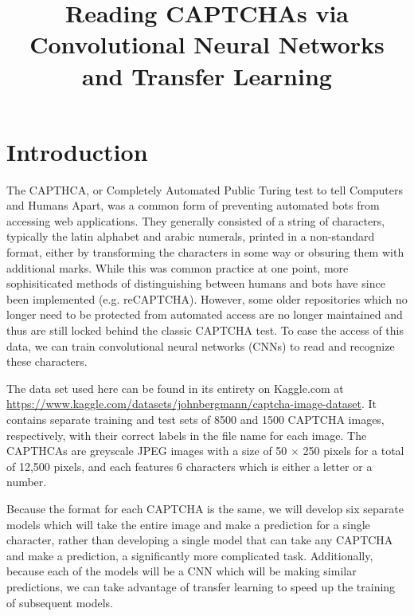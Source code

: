 \documentclass[12pt]{article}
\title{Reading CAPTCHAs via Convolutional Neural Networks and Transfer Learning}
\date{}
\begin{document}
\maketitle

\section*{Introduction}


The CAPTHCA, or Completely Automated Public Turing test to tell Computers
and Humans Apart, was a common form of preventing automated bots from accessing
web applications. They generally consisted of a string of characters, typically
the latin alphabet and arabic numerals, printed in a non-standard format, either
by transforming the characters in some way or obsuring them with additional
marks. While this was common practice at one point, more sophisiticated methods
of distinguishing between humans and bots have since been implemented (e.g.
reCAPTCHA). However, some older repositories which no longer need to be
protected from automated access are no longer maintained and thus are still
locked behind the classic CAPTCHA test. To ease the access of this data, we can
train convolutional neural networks (CNNs) to read and recognize these
characters.


The data set used here can be found in its entirety on Kaggle.com at
\url{https://www.kaggle.com/datasets/johnbergmann/captcha-image-dataset}. It
contains separate training and test sets of 8500 and 1500 CAPTCHA images,
respectively, with their correct labels in the file name for each image. The 
CAPTHCAs are greyscale JPEG images with a size of 50 $\times$ 250 pixels for a
total of 12,500 pixels, and each features 6 characters which is either a letter 
or a number. 

Because the format for each CAPTCHA is the same, we will develop six separate
models which will take the entire image and make a prediction for a single
character, rather than developing a single model that can take any CAPTCHA and
make a prediction, a significantly more complicated task. Additionally, because
each of the models will be a CNN which will be making similar predictions, we
can take advantage of transfer learning to speed up the training of subsequent
models.
\end{document}
